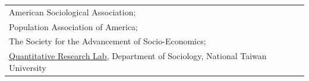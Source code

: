 \begin{longtable}{@{}p{\textwidth}@{}}
American Sociological Association; \\[2pt]
Population Association of America; \\[2pt]
The Society for the Advancement of Socio-Economics; \\[2pt]
\href{https://webpageprodvm.ntu.edu.tw/soc.quant.lab/Default.aspx}{Quantitative Research Lab}, Department of Sociology, National Taiwan University
\end{longtable}